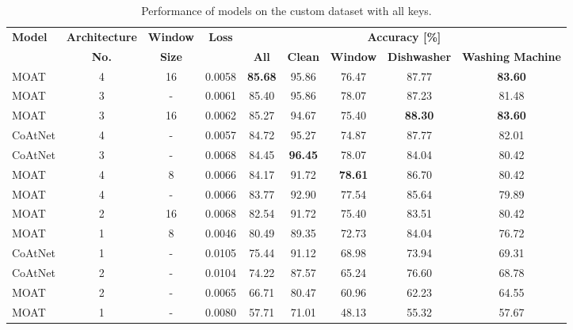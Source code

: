 \documentclass[a4paper,11pt,twoside]{report}
\theoremstyle{definition}
\begin{document}
\begin{table}[h!]
\centering
\caption{Performance of models on the custom dataset with all keys.}
\begin{adjustbox}{max width=\textwidth}
\begin{tabular}{l|c|c|c|ccccc}
\hline
\textbf{Model} & \textbf{Architecture} & \textbf{Window} & \textbf{Loss} & \multicolumn{5}{c}{\textbf{Accuracy [\%]}} \\
\cline{5-9}
       &   \textbf{No.}  &   \textbf{Size}   &   & \textbf{All} & \textbf{Clean} & \textbf{Window} & \textbf{Dishwasher} & \textbf{Washing Machine}  \\
\hline
MOAT & 4 & 16 & 0.0058 & \textbf{85.68} & 95.86 & 76.47 & 87.77 & \textbf{83.60} \\
MOAT & 3 & - & 0.0061 & 85.40 & 95.86 & 78.07 & 87.23 & 81.48 \\
MOAT & 3 & 16 & 0.0062 & 85.27 & 94.67 & 75.40 & \textbf{88.30} & \textbf{83.60} \\
CoAtNet & 4 & - & 0.0057 & 84.72 & 95.27 & 74.87 & 87.77 & 82.01 \\
CoAtNet & 3 & - & 0.0068 & 84.45 & \textbf{96.45} & 78.07 & 84.04 & 80.42 \\
MOAT & 4 & 8 & 0.0066 & 84.17 & 91.72 & \textbf{78.61} & 86.70 & 80.42 \\
MOAT & 4 & - & 0.0066 & 83.77 & 92.90 & 77.54 & 85.64 & 79.89 \\
MOAT & 2 & 16 & 0.0068 & 82.54 & 91.72 & 75.40 & 83.51 & 80.42 \\
MOAT & 1 & 8 & 0.0046 & 80.49 & 89.35 & 72.73 & 84.04 & 76.72 \\
CoAtNet & 1 & - & 0.0105 & 75.44 & 91.12 & 68.98 & 73.94 & 69.31 \\
CoAtNet & 2 & - & 0.0104 & 74.22 & 87.57 & 65.24 & 76.60 & 68.78 \\
MOAT & 2 & - & 0.0065 & 66.71 & 80.47 & 60.96 & 62.23 & 64.55 \\
MOAT & 1 & - & 0.0080 & 57.71 & 71.01 & 48.13 & 55.32 & 57.67 \\
\hline
\end{tabular}
\end{adjustbox}
\end{table}
\end{document}
